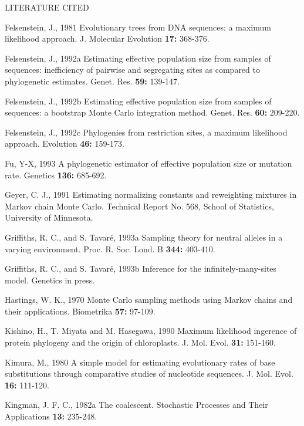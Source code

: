 \documentclass[12pt]{article}
\begin{document}
\begin{center}
LITERATURE CITED
\bigskip
\end{center}

{\parindent=-0.2in

{\sc Felsenstein}, J.,  1981  Evolutionary trees from DNA sequences: a maximum
     likelihood approach.  J. Molecular Evolution {\bf 17:} 368-376.

\medskip
{\sc Felsenstein}, J., 1992a  Estimating effective population size from
samples of sequences:  inefficiency of pairwise and segregating sites as
compared to phylogenetic estimates.  Genet. Res. {\bf 59:} 139-147.

\medskip
{\sc Felsenstein}, J., 1992b  Estimating effective population size from
samples of sequences:  a bootstrap Monte Carlo integration method.
Genet. Res. {\bf 60:} 209-220.

\medskip
{\sc Felsenstein,} J.,  1992c  Phylogenies from restriction sites, a maximum
likelihood approach.  Evolution  {\bf 46:} 159-173.

\medskip
{\sc Fu,} Y-X, 1993  A phylogenetic estimator of effective population size or
mutation rate.  Genetics {\bf 136:} 685-692.

\medskip
{\sc Geyer,} C. J., 1991  Estimating normalizing constants and reweighting
mixtures in Markov chain Monte Carlo.  Technical Report No. 568, School
of Statistics, University of Minnesota.

\medskip
{\sc Griffiths,} R. C., and S. {\sc Tavar\'{e}}, 1993a  Sampling theory for neutral
alleles in a varying environment.  Proc. R. Soc. Lond. B {\bf 344:}
403-410.

\medskip
{\sc Griffiths,} R. C., and S. {\sc Tavar\'{e}}, 1993b  Inference for the 
infinitely-many-sites model.  Genetics in press.

\medskip
{\sc Hastings,} W. K., 1970  Monte Carlo sampling methods using Markov chains
and their applications.  Biometrika {\bf 57:} 97-109.

\medskip
{\sc Kishino, H., T. Miyata} and {\sc M. Hasegawa}, 1990  Maximum
likelihood ingerence of protein phylogeny and the origin of
chloroplasts.  J. Mol. Evol. {\bf 31:} 151-160.

\medskip
{\sc Kimura,} M., 1980  A simple model for estimating evolutionary rates of base
     substitutions through comparative studies of nucleotide sequences.
     J. Mol. Evol. {\bf 16:} 111-120.

\medskip
{\sc Kingman,} J. F. C.,  1982a  The coalescent.  Stochastic Processes and Their
     Applications {\bf 13:} 235-248.

}
\end{document}
